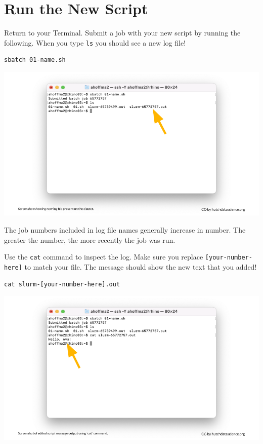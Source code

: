 \documentclass[
]{book}
\begin{document}
\hypertarget{run-the-new-script}{%
\section{Run the New Script}\label{run-the-new-script}}

Return to your Terminal. Submit a job with your new script by running the following. When you type \texttt{ls} you should see a new log file!

\begin{verbatim}
sbatch 01-name.sh
\end{verbatim}

\includegraphics[width=1\linewidth]{resources/images/08-upload-download_files/figure-latex//1BQxrVYdKZTbpCaF-i_q9w7s9x034lEXpQZDU-Sl09cs_gff2211b72f_1_0}

The job numbers included in log file names generally increase in number. The greater the number, the more recently the job was run.

Use the \texttt{cat} command to inspect the log. Make sure you replace \texttt{{[}your-number-here{]}} to match your file. The message should show the new text that you added!

\begin{verbatim}
cat slurm-[your-number-here].out
\end{verbatim}

\includegraphics[width=1\linewidth]{resources/images/08-upload-download_files/figure-latex//1BQxrVYdKZTbpCaF-i_q9w7s9x034lEXpQZDU-Sl09cs_gff2211b72f_1_6}
\end{document}
